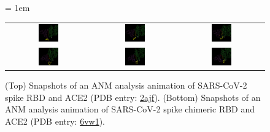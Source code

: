 \begin{figure}[h]
	\centering
	\tabcolsep = 1em
	\mySfFamily
	\begin{tabular}{c c c}
		\includegraphics[width = 0.25\textwidth]{../images/2ajf_animation1.png} & \includegraphics[width = 0.25\textwidth]{../images/2ajf_animation2.png} & \includegraphics[width = 0.25\textwidth]{../images/2ajf_animation3.png} \\[3ex]
		\includegraphics[width = 0.25\textwidth]{../images/6vw1_animation1.png} & \includegraphics[width = 0.25\textwidth]{../images/6vw1_animation2.png} & \includegraphics[width = 0.25\textwidth]{../images/6vw1_animation3.png}
	\end{tabular}
	\caption{(Top) Snapshots of an ANM analysis animation of SARS-CoV-2 spike RBD and ACE2 (PDB entry: \href{https://www.rcsb.org/structure/2ajf}{2ajf}). (Bottom) Snapshots of an ANM analysis animation of SARS-CoV-2 spike chimeric RBD and ACE2 (PDB entry: \href{https://www.rcsb.org/structure/6vw1}{6vw1}).}
	\label{fig:coronavirus_anm_animation}
\end{figure}

